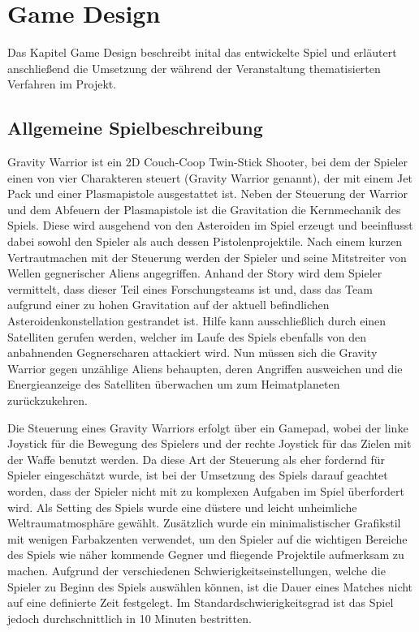\documentclass[11pt]{scrartcl}
\begin{document}
\newpage
\section{Game Design}
Das Kapitel Game Design beschreibt inital das entwickelte Spiel und erläutert anschließend die Umsetzung der während der Veranstaltung thematisierten Verfahren im Projekt.
\subsection{Allgemeine Spielbeschreibung}
Gravity Warrior ist ein 2D Couch-Coop Twin-Stick Shooter, bei dem der Spieler einen von vier Charakteren steuert (Gravity Warrior genannt), der mit einem Jet Pack und einer Plasmapistole ausgestattet ist. Neben der Steuerung der Warrior und dem Abfeuern der Plasmapistole ist die Gravitation die Kernmechanik des Spiels. Diese wird ausgehend von den Asteroiden im Spiel erzeugt und beeinflusst dabei sowohl den Spieler als auch dessen Pistolenprojektile. Nach einem kurzen Vertrautmachen mit der Steuerung werden der Spieler und seine Mitstreiter von Wellen gegnerischer Aliens angegriffen. Anhand der Story wird dem Spieler vermittelt, dass dieser Teil eines Forschungsteams ist und, dass das Team aufgrund einer zu hohen Gravitation auf der aktuell befindlichen Asteroidenkonstellation gestrandet ist. Hilfe kann ausschließlich durch einen Satelliten gerufen werden, welcher im Laufe des Spiels ebenfalls von den anbahnenden Gegnerscharen attackiert wird. Nun müssen sich die Gravity Warrior gegen unzählige Aliens behaupten, deren Angriffen ausweichen und die Energieanzeige des Satelliten überwachen um zum Heimatplaneten zurückzukehren.

Die Steuerung eines Gravity Warriors erfolgt über ein Gamepad, wobei der linke Joystick für die Bewegung des Spielers und der rechte Joystick für das Zielen mit der Waffe benutzt werden. Da diese Art der Steuerung als eher fordernd für Spieler eingeschätzt wurde, ist bei der Umsetzung des Spiels darauf geachtet worden, dass der Spieler nicht mit zu komplexen Aufgaben im Spiel überfordert wird. Als Setting des Spiels wurde eine düstere und leicht unheimliche Weltraumatmosphäre gewählt. Zusätzlich wurde ein minimalistischer Grafikstil mit wenigen Farbakzenten verwendet, um den Spieler auf die wichtigen Bereiche des Spiels wie näher kommende Gegner und fliegende Projektile aufmerksam zu machen. Aufgrund der verschiedenen Schwierigkeitseinstellungen, welche die Spieler zu Beginn des Spiels auswählen können, ist die Dauer eines Matches nicht auf eine definierte Zeit festgelegt. Im Standardschwierigkeitsgrad ist das Spiel jedoch durchschnittlich in 10 Minuten bestritten.
\end{document}
